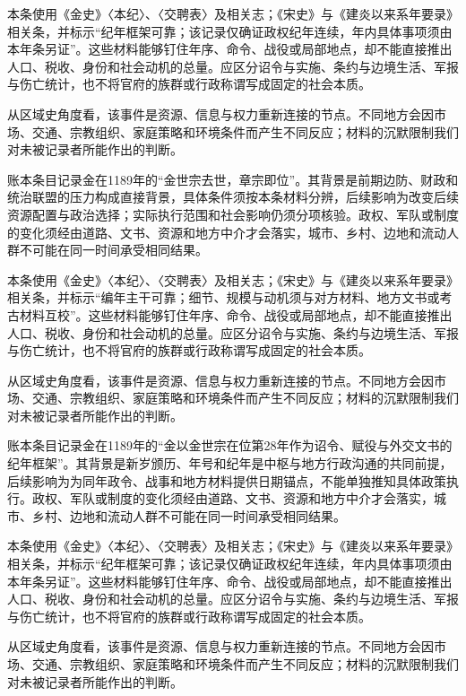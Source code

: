 本条使用《金史》〈本纪〉、〈交聘表〉及相关志；《宋史》与《建炎以来系年要录》相关条，并标示“纪年框架可靠；该记录仅确证政权纪年连续，年内具体事项须由本年条另证”。这些材料能够钉住年序、命令、战役或局部地点，却不能直接推出人口、税收、身份和社会动机的总量。应区分诏令与实施、条约与边境生活、军报与伤亡统计，也不将官府的族群或行政称谓写成固定的社会本质。

从区域史角度看，该事件是资源、信息与权力重新连接的节点。不同地方会因市场、交通、宗教组织、家庭策略和环境条件而产生不同反应；材料的沉默限制我们对未被记录者所能作出的判断。

账本条目记录金在1189年的“金世宗去世，章宗即位”。其背景是前期边防、财政和统治联盟的压力构成直接背景，具体条件须按本条材料分辨，后续影响为改变后续资源配置与政治选择；实际执行范围和社会影响仍须分项核验。政权、军队或制度的变化须经由道路、文书、资源和地方中介才会落实，城市、乡村、边地和流动人群不可能在同一时间承受相同结果。

本条使用《金史》〈本纪〉、〈交聘表〉及相关志；《宋史》与《建炎以来系年要录》相关条，并标示“编年主干可靠；细节、规模与动机须与对方材料、地方文书或考古材料互校”。这些材料能够钉住年序、命令、战役或局部地点，却不能直接推出人口、税收、身份和社会动机的总量。应区分诏令与实施、条约与边境生活、军报与伤亡统计，也不将官府的族群或行政称谓写成固定的社会本质。

从区域史角度看，该事件是资源、信息与权力重新连接的节点。不同地方会因市场、交通、宗教组织、家庭策略和环境条件而产生不同反应；材料的沉默限制我们对未被记录者所能作出的判断。

账本条目记录金在1189年的“金以金世宗在位第28年作为诏令、赋役与外交文书的纪年框架”。其背景是新岁颁历、年号和纪年是中枢与地方行政沟通的共同前提，后续影响为为同年政令、战事和地方材料提供日期锚点，不能单独推知具体政策执行。政权、军队或制度的变化须经由道路、文书、资源和地方中介才会落实，城市、乡村、边地和流动人群不可能在同一时间承受相同结果。

本条使用《金史》〈本纪〉、〈交聘表〉及相关志；《宋史》与《建炎以来系年要录》相关条，并标示“纪年框架可靠；该记录仅确证政权纪年连续，年内具体事项须由本年条另证”。这些材料能够钉住年序、命令、战役或局部地点，却不能直接推出人口、税收、身份和社会动机的总量。应区分诏令与实施、条约与边境生活、军报与伤亡统计，也不将官府的族群或行政称谓写成固定的社会本质。

从区域史角度看，该事件是资源、信息与权力重新连接的节点。不同地方会因市场、交通、宗教组织、家庭策略和环境条件而产生不同反应；材料的沉默限制我们对未被记录者所能作出的判断。

